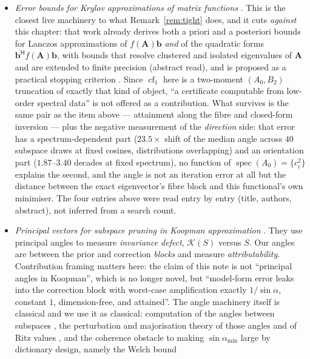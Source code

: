 \documentclass[11pt]{article}
\theoremstyle{remark}
\begin{document}
\begin{itemize}
hits and on the interlacing fact, not on a low count.
\item \emph{Error bounds for Krylov approximations of matrix functions}
\cite{chen2021,xu2022,frommer2012,simunec2023}. This is the closest live
machinery to what Remark~\ref{rem:tight} does, and it cuts \emph{against} this chapter: that work
already derives both a priori and a posteriori bounds for Lanczos approximations of
$f(\mathbf{A})\mathbf{b}$ \emph{and} of the quadratic forms $\mathbf{b}^{\textsf{H}}f(\mathbf{A})\mathbf{b}$,
with bounds that resolve clustered and isolated eigenvalues of $\mathbf{A}$ and are extended to finite
precision \cite{chen2021} (abstract read), and is proposed as a practical stopping criterion
\cite{xu2022}. Since $\operatorname{cf}_1$ here is a two-moment $(A_0,B_2)$ truncation of exactly
that kind of object, ``a certificate computable from low-order spectral data'' is not offered as a
contribution. What survives is the same pair as the item above --- attainment along the fibre and
closed-form inversion --- plus the negative measurement of the \emph{direction} side: that
error has a spectrum-dependent part ($23.5\times$ shift of the median angle across $40$ subspace draws
at fixed cosines, distributions overlapping) and
an orientation part ($1.87$--$3.40$ decades at fixed spectrum), no function of
$\operatorname{spec}(A_0)=\{c_i^2\}$ explains the second, and the angle is not an iteration error at all
but the distance between the exact eigenvector's fibre block and this functional's own minimiser. The
four entries above were read entry by entry (title, authors, abstract), not inferred from a search count.
\item \emph{Principal vectors for subspace pruning in Koopman approximation}
\cite{shah2026}. They use principal angles to measure
\emph{invariance defect}, $\mathcal K(S)$ versus $S$. Our angles are between the prior
and correction \emph{blocks} and measure \emph{attributability}. Contribution framing
matters here: the claim of this note is not ``principal angles in Koopman'', which is
no longer novel, but ``model-form error leaks into the correction block with worst-case
amplification exactly $1/\sin\alpha$, constant $1$, dimension-free, and attained''.
The angle machinery itself is classical and we use it as classical: computation of the angles
between subspaces \cite{bjorckgolub1973}, the perturbation and majorisation theory of those angles
and of Ritz values \cite{knyazevargentati2002,knyazevargentati2006,drmac2000}, and the coherence
obstacle to making $\sin\alpha_{\min}$ large by dictionary design, namely the Welch bound

\end{itemize}
\end{document}
